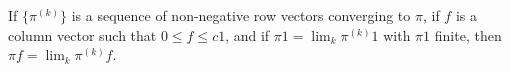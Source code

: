If $\{\pi^{(k)}\}$ is a sequence of non-negative row vectors converging to $\pi$, if $f$ is a column vector such that $0 \leq f \leq c1$, and if $\pi 1 = \lim_k \pi^{(k)} 1$ with $\pi 1$ finite, then $\pi f = \lim_k \pi^{(k)} f$.
